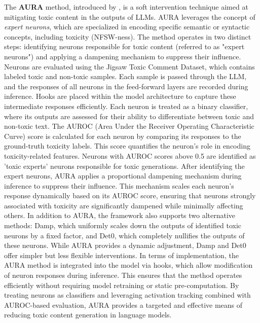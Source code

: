 The \textbf{AURA} method, introduced by \citet{suau2024whispering}, is a soft intervention technique aimed at mitigating toxic content in the outputs of LLMs. AURA leverages the concept of \textit{expert neurons}, which are specialized in encoding specific semantic or syntactic concepts, including toxicity (\ie NFSW-ness). The method operates in two distinct steps: identifying neurons responsible for toxic content (referred to as "expert neurons") and applying a dampening mechanism to suppress their influence. Neurons are evaluated using the Jigsaw Toxic Comment Dataset, which contains labeled toxic and non-toxic samples. Each sample is passed through the LLM, and the responses of all neurons in the feed-forward layers are recorded during inference. Hooks are placed within the model architecture to capture these intermediate responses efficiently. Each neuron is treated as a binary classifier, where its outputs are assessed for their ability to differentiate between toxic and non-toxic text. The AUROC (Area Under the Receiver Operating Characteristic Curve) score is calculated for each neuron by comparing its responses to the ground-truth toxicity labels. This score quantifies the neuron’s role in encoding toxicity-related features. Neurons with AUROC scores above 0.5 are identified as 'toxic experts' \ie neurons responsible for toxic generations.
After identifying the expert neurons, AURA applies a proportional dampening mechanism during inference to suppress their influence. This mechanism scales each neuron’s response dynamically based on its AUROC score, ensuring that neurons strongly associated with toxicity are significantly dampened while minimally affecting others. In addition to AURA, the framework also supports two alternative methods: Damp, which uniformly scales down the outputs of identified toxic neurons by a fixed factor, and Det0, which completely nullifies the outputs of these neurons. While AURA provides a dynamic adjustment, Damp and Det0 offer simpler but less flexible interventions. 
In terms of implementation, the AURA method is integrated into the model via hooks, which allow modification of neuron responses during inference. This ensures that the method operates efficiently without requiring model retraining or static pre-computation. By treating neurons as classifiers and leveraging activation tracking combined with AUROC-based evaluation, AURA provides a targeted and effective means of reducing toxic content generation in language models.

